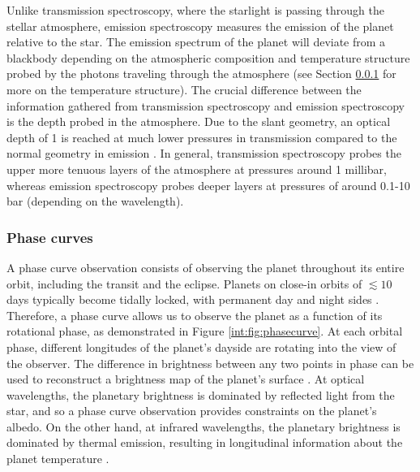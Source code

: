 Unlike transmission spectroscopy, where the starlight is passing through the stellar atmosphere, emission spectroscopy measures the emission of the planet relative to the star. The emission spectrum of the planet will deviate from a blackbody depending on the atmospheric composition and temperature structure probed by the photons traveling through the atmosphere (see Section \ref{} for more on the temperature structure). The crucial difference between the information gathered from transmission spectroscopy and emission spectroscopy is the depth probed in the atmosphere. Due to the slant geometry, an optical depth of 1 is reached at much lower pressures in transmission compared to the normal geometry in emission \citep{Fortney2005}. In general, transmission spectroscopy probes the upper more tenuous layers of the atmosphere at pressures around 1 millibar, whereas emission spectroscopy probes deeper layers at pressures of around 0.1-10 bar (depending on the wavelength).

\subsubsection{Phase curves}

A phase curve observation consists of observing the planet throughout its entire orbit, including the transit and the eclipse. Planets on close-in orbits of $\lesssim10$ days typically become tidally locked, with permanent day and night sides \citep[e.g.,][]{Guillot1996}. Therefore, a phase curve allows us to observe the planet as a function of its rotational phase, as demonstrated in Figure \ref{int:fig:phasecurve}. At each orbital phase, different longitudes of the planet's dayside are rotating into the view of the observer. The difference in brightness between any two points in phase can be used to reconstruct a brightness map of the planet's surface \citep{Knutson2007, Knutson2012, Crossfield2012, Borucki2009, Snellen2009}. At optical wavelengths, the planetary brightness is dominated by reflected light from the star, and so a phase curve observation provides constraints on the planet's albedo. On the other hand, at infrared wavelengths, the planetary brightness is dominated by thermal emission, resulting in longitudinal information about the planet temperature \citep{Parmentier2018b}.

